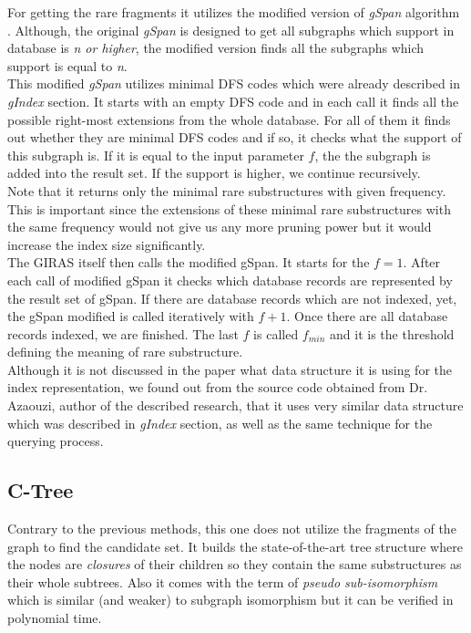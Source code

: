 For getting the rare fragments it utilizes the modified version of \textit{gSpan} algorithm \cite{gspan}. Although, the original \textit{gSpan} is designed to get all subgraphs which support in database is \textit{n or higher}, the modified version finds all the subgraphs which support is equal to \textit{n}.\\

This modified \textit{gSpan} utilizes minimal DFS codes which were already described in \textit{gIndex} section. It starts with an empty DFS code and in each call it finds all the possible right-most extensions from the whole database. For all of them it finds out whether they are minimal DFS codes and if so, it checks what the support of this subgraph is. If it is equal to the input parameter $f$, the the subgraph is added into the result set. If the support is higher, we continue recursively.\\

Note that it returns only the minimal rare substructures with given frequency. This is important since the extensions of these minimal rare substructures with the same frequency would not give us any more pruning power but it would increase the index size significantly.\\

The GIRAS itself then calls the modified gSpan. It starts for the $f=1$. After each call of modified gSpan it checks which database records are represented by the result set of gSpan. If there are database records which are not indexed, yet, the gSpan modified is called iteratively with $f+1$. Once there are all database records indexed, we are finished. The last $f$ is called $f_{min}$ and it is the threshold defining the meaning of rare substructure.\\

Although it is not discussed in the paper\cite{GIRAS} what data structure it is using for the index representation, we found out from the source code obtained from Dr. Azaouzi, author of the described research, that it uses very similar data structure which was described in \textit{gIndex} section, as well as the same technique for the querying process.

\subsection{C-Tree}

Contrary to the previous methods, this one does not utilize the fragments of the graph to find the candidate set. It builds the state-of-the-art tree structure where the nodes are \textit{closures} of their children so they contain the same substructures as their whole subtrees. Also it comes with the term of \textit{pseudo sub-isomorphism} which is similar (and weaker) to subgraph isomorphism but it can be verified in polynomial time.\\

